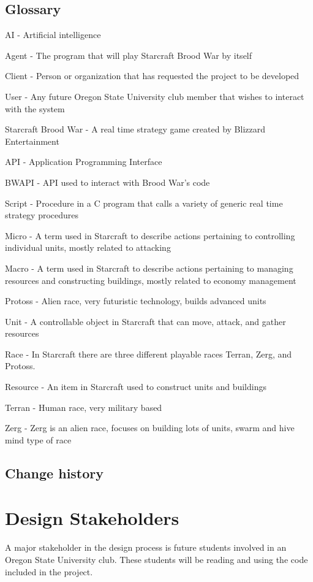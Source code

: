 \documentclass[10pt,letterpaper,onecolumn,draftclsnofoot]{IEEEtran}
\begin{document}
\subsection{Glossary}
	AI - Artificial intelligence
	
	Agent - The program that will play Starcraft Brood War by itself
	
	Client - Person or organization that has requested the project to be developed
	
	User - Any future Oregon State University club member that wishes to interact with the system
	
	Starcraft Brood War - A real time strategy game created by Blizzard Entertainment
	
	API - Application Programming Interface
	
	BWAPI - API used to interact with Brood War's code
	
	Script - Procedure in a C program that calls a variety of generic real time strategy procedures
	
	Micro - A term used in Starcraft to describe actions pertaining to controlling individual units, mostly related to attacking
	
	Macro - A term used in Starcraft to describe actions pertaining to managing resources and constructing buildings, mostly related to economy management
	
	Protoss - Alien race, very futuristic technology, builds advanced units
	
	Unit - A controllable object in Starcraft that can move, attack, and gather resources
	
	Race - In Starcraft there are three different playable races Terran, Zerg, and Protoss.
	
	Resource - An item in Starcraft used to construct units and buildings
	
	Terran - Human race, very military based
	
	Zerg - Zerg is an alien race, focuses on building lots of units, swarm and hive mind type of race
\subsection{Change history}


\section{Design Stakeholders}
	A major stakeholder in the design process is future students involved in an Oregon State University club. These students will be reading and using the code included in the project.
	
\end{document}
